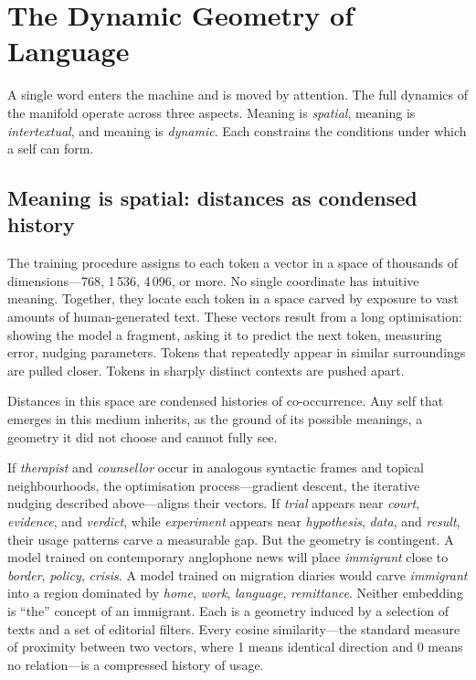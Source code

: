 \section{The Dynamic Geometry of Language}

A single word enters the machine and is moved by attention. The full dynamics of the manifold operate across three aspects. Meaning is \emph{spatial}, meaning is \emph{intertextual}, and meaning is \emph{dynamic}. Each constrains the conditions under which a self can form.

\subsection{Meaning is spatial: distances as condensed history}

The training procedure assigns to each token a vector in a space of thousands of dimensions---768, 1\,536, 4\,096, or more. No single coordinate has intuitive meaning. Together, they locate each token in a space carved by exposure to vast amounts of human-generated text. These vectors result from a long optimisation: showing the model a fragment, asking it to predict the next token, measuring error, nudging parameters. Tokens that repeatedly appear in similar surroundings are pulled closer. Tokens in sharply distinct contexts are pushed apart.

Distances in this space are condensed histories of co-occurrence. Any self that emerges in this medium inherits, as the ground of its possible meanings, a geometry it did not choose and cannot fully see.

If \emph{therapist} and \emph{counsellor} occur in analogous syntactic frames and topical neighbourhoods, the optimisation process---gradient descent, the iterative nudging described above---aligns their vectors. If \emph{trial} appears near \emph{court}, \emph{evidence}, and \emph{verdict}, while \emph{experiment} appears near \emph{hypothesis}, \emph{data}, and \emph{result}, their usage patterns carve a measurable gap. But the geometry is contingent. A model trained on contemporary anglophone news will place \emph{immigrant} close to \emph{border}, \emph{policy}, \emph{crisis}. A model trained on migration diaries would carve \emph{immigrant} into a region dominated by \emph{home}, \emph{work}, \emph{language}, \emph{remittance}. Neither embedding is ``the'' concept of an immigrant. Each is a geometry induced by a selection of texts and a set of editorial filters. Every cosine similarity---the standard measure of proximity between two vectors, where 1 means identical direction and 0 means no relation---is a compressed history of usage.

